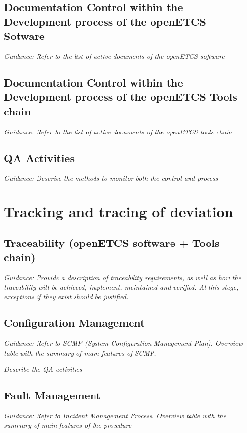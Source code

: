 \documentclass{template/openetcs_article}
\begin{document}
\subsection{Documentation Control within the Development process of the openETCS Sotware}
\textit{Guidance: Refer to the list of active documents of the openETCS software}

\subsection{Documentation Control within the Development process of the openETCS Tools chain}
\textit{Guidance: Refer to the list of active documents of the openETCS tools chain}

\subsection{QA Activities}
\textit{Guidance: Describe the methods to monitor both the control and process}

\section{Tracking and tracing of deviation}


\subsection{Traceability (openETCS software + Tools chain)}
\textit{Guidance: Provide a description of traceability requirements, as well as how the traceability will be achieved, implement, maintained and verified. At this stage, exceptions if they exist should be justified.}

\subsection{Configuration Management}
\textit{Guidance: Refer to SCMP (System Configuration Management Plan). Overview table with the summary of main features of SCMP.}


\textit{Describe the QA activities}

\subsection{Fault Management}
\textit{Guidance: Refer to Incident Management Process. Overview table with the summary of main features of the procedure}
\end{document}
